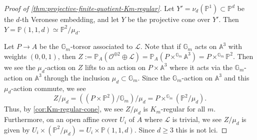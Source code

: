 \documentclass{amsart}
\theoremstyle{definition}
\newcommand{\bG}{\mathbb{G}}
\newcommand{\bP}{\mathbb{P}}
\newcommand{\bA}{\mathbb{A}}
\newcommand{\cO}{\mathcal{O}}
\newcommand{\cL}{\mathcal{L}}
\begin{document}
\begin{proof}[{Proof of \autoref{thm:projective-finite-quotient-Km-regular}}]
Let $Y'=\nu_d(\bP^1)\subset\bP^d$ be the $d$-th Veronese embedding, and let $Y$ be the projective cone over $Y'$. Then $Y=\bP(1,1,d)\simeq\bP^2/\mu_d$. 

Let $P\to A$ be the $\bG_m$-torsor associated to $\cL$. Note that if $\bG_m$ acts on $\bA^3$ with weights $(0,0,1)$, then $Z:=\bP_A(\cO^{\oplus2}\oplus\cL)=\bP_A(P\times^{\bG_m}\bA^3)=P\times^{\bG_m}\bP^2$. Then we see the $\mu_d$-action on $Z$ lifts to an action on $P\times\bA^3$ where it acts via the $\bG_m$-action on $\bA^3$ through the inclusion $\mu_d\subset\bG_m$. Since the $\bG_m$-action on $\bA^3$ and this $\mu_d$-action commute, we see
\[
    Z/\mu_d=((P\times\bP^2)/\bG_m)/\mu_d=P\times^{\bG_m}(\bP^2/\mu_d).
\]
Thus, by \autoref{cor:Km-regular-cone}, we see $Z/\mu_d$ is $K_m$-regular for all $m$. Furthermore, on an open affine cover $U_i$ of $A$ where $\cL$ is trivial, we see $Z/\mu_d$ is given by $U_i\times(\bP^2/\mu_d)=U_i\times\bP(1,1,d)$. Since $d\geq3$ this is not lci.
\end{proof}








\end{document}
